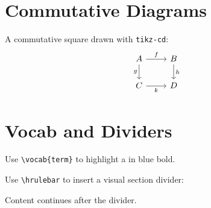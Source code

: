 \section{Commutative Diagrams}

\begin{eg}
	A commutative square drawn with \texttt{tikz-cd}:
	\[
		\begin{tikzcd}
			A \arrow[r, "f"] \arrow[d, "g"'] & B \arrow[d, "h"] \\
			C \arrow[r, "k"']                & D
		\end{tikzcd}
	\]
\end{eg}

\section{Vocab and Dividers}

Use \texttt{\textbackslash vocab\{term\}} to highlight a  in blue bold.

Use \texttt{\textbackslash hrulebar} to insert a visual section divider:

\hrulebar

Content continues after the divider.
